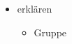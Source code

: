 \begin{frame}[standout]
\begin{itemize}
\item erklären
\begin{itemize}
\item Gruppe
\end{itemize}
\end{itemize}
\end{frame}
